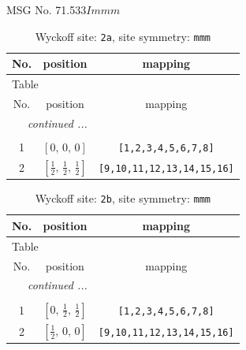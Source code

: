 \documentclass[fleqn,8pt]{jsarticle}
\begin{document}
\setcounter{MaxMatrixCols}{32}

\renewcommand{\tablename}{Table~}
\renewcommand{\figurename}{Figure~}
\begin{center}
\LARGE
MSG No. 71.533\quad$Immm$
\end{center}
\renewcommand{\arraystretch}{1.2}
\begin{longtable}{ccc}
\caption{Wyckoff site: {\tt 2a}, site symmetry: {\tt mmm}}
 \\
 \hline \hline
No. & position & mapping \\ \hline \endfirsthead

\multicolumn{2}{l}{\tablename\ \thetable{}} \\
 \hline \hline
No. & position & mapping \\ \hline \endhead

 \hline \hline
\multicolumn{2}{r}{\footnotesize\it continued ...} \\ \endfoot

 \hline \hline
\multicolumn{2}{r}{} \\ \endlastfoot

1 & $\left[ 0,\, 0,\, 0 \right]$ & {\tt [1,2,3,4,5,6,7,8]} \\ \hline
2 & $\left[ \frac{1}{2},\, \frac{1}{2},\, \frac{1}{2} \right]$ & {\tt [9,10,11,12,13,14,15,16]} \\
\end{longtable}
\renewcommand{\arraystretch}{1.2}
\begin{longtable}{ccc}
\caption{Wyckoff site: {\tt 2b}, site symmetry: {\tt mmm}}
 \\
 \hline \hline
No. & position & mapping \\ \hline \endfirsthead

\multicolumn{2}{l}{\tablename\ \thetable{}} \\
 \hline \hline
No. & position & mapping \\ \hline \endhead

 \hline \hline
\multicolumn{2}{r}{\footnotesize\it continued ...} \\ \endfoot

 \hline \hline
\multicolumn{2}{r}{} \\ \endlastfoot

1 & $\left[ 0,\, \frac{1}{2},\, \frac{1}{2} \right]$ & {\tt [1,2,3,4,5,6,7,8]} \\ \hline
2 & $\left[ \frac{1}{2},\, 0,\, 0 \right]$ & {\tt [9,10,11,12,13,14,15,16]} \\
\end{longtable}
\end{document}
